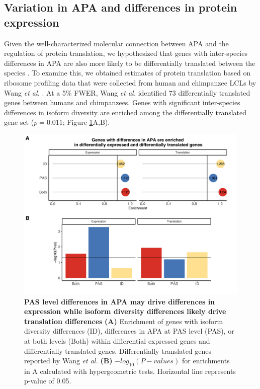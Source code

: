 \subsection{Variation in APA and differences in protein expression}\label{dAPAdp}

Given the well-characterized molecular connection between APA and the regulation of protein translation, we hypothesized that genes with inter-species differences in APA are also more likely to be differentially translated between the species \citep{digiammartino_mechanisms_2011,floor_tunable_2016-1,tian_alternative_2017}. To examine this, we obtained estimates of protein translation based on ribosome profiling data that were collected from human and chimpanzee LCLs by Wang \emph{et al.} \citep{wang_post-translational_2018}. At a 5\% FWER, Wang \emph{et al.} identified 73 differentially translated genes between humans and chimpanzees. Genes with significant inter-species differences in isoform diversity are enriched among the differentially translated gene set ($p = 0.011$; Figure \ref{fig:Ch3fig5}A,B). 

\begin{figure}
\centering
\includegraphics[width=5in]{img/ch03/fig5.pdf}
\caption[PAS level differences in APA may drive differences in expression while isoform diversity differences likely drive translation differences]{\textbf{PAS level differences in APA may drive differences in expression while isoform diversity differences likely drive translation differences} \small {\bf (A)} Enrichment of genes with isoform diversity differences (ID), differences in APA at PAS level (PAS), or at both levels (Both) within differential expressed genes and differentially translated genes. Differentially translated genes reported by Wang \emph{et al.}\citep{wang_post-translational_2018} {\bf (B)} $-log_{10}(P-values)$ for enrichments in A calculated with hypergeometric tests. Horizontal line represents p-value of 0.05.} 
\label{fig:Ch3fig5}
\end{figure}


